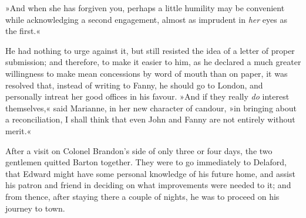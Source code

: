 »And when she has forgiven you, perhaps a little humility may be convenient while acknowledging a second engagement, almost as imprudent in \textit{her} eyes as the first.«

He had nothing to urge against it, but still resisted the idea of a letter of proper submission; and therefore, to make it easier to him, as he declared a much greater willingness to make mean concessions by word of mouth than on paper, it was resolved that, instead of writing to Fanny, he should go to London, and personally intreat her good offices in his favour. »And if they really \textit{do} interest themselves,« said Marianne, in her new character of candour, »in bringing about a reconciliation, I shall think that even John and Fanny are not entirely without merit.«

After a visit on Colonel Brandon’s side of only three or four days, the two gentlemen quitted Barton together. They were to go immediately to Delaford, that Edward might have some personal knowledge of his future home, and assist his patron and friend in deciding on what improvements were needed to it; and from thence, after staying there a couple of nights, he was to proceed on his journey to town.